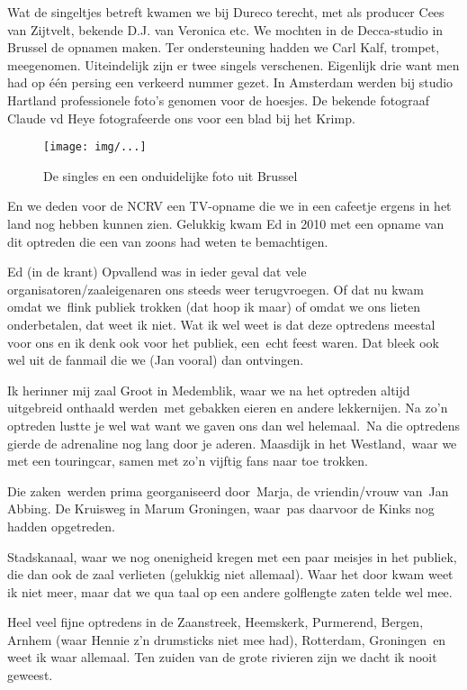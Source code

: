 \documentclass[10pt,twoside,openright]{memoir}
\begin{document}
Wat de singeltjes betreft kwamen we bij Dureco terecht, met als producer Cees van Zijtvelt, bekende D.J. van Veronica etc. We mochten in de Decca-studio in Brussel de opnamen maken. Ter ondersteuning hadden we Carl Kalf, trompet, meegenomen. Uiteindelijk zijn er twee singels verschenen. Eigenlijk drie want men had op één persing een verkeerd nummer gezet. In Amsterdam werden bij studio Hartland professionele foto’s genomen voor de hoesjes. De bekende fotograaf Claude vd Heye fotografeerde ons voor een blad bij het Krimp.

\begin{figure}[t]
\texttt{[image: img/...]}
\caption{De singles en een onduidelijke foto uit Brussel}
\end{figure}

En we deden voor de NCRV een TV-opname die we in een cafeetje ergens in het land nog hebben kunnen zien. Gelukkig kwam Ed in 2010 met een opname van dit optreden die een van zoons had weten te bemachtigen.

Ed (in de krant) Opvallend was in ieder geval dat vele organisatoren/zaaleigenaren ons steeds weer terugvroegen. Of dat nu kwam omdat we flink publiek trokken (dat hoop ik maar) of omdat we ons lieten onderbetalen, dat weet ik niet. Wat ik wel weet is dat deze optredens meestal voor ons en ik denk ook voor het publiek, een echt feest waren. Dat bleek ook wel uit de fanmail die we (Jan vooral) dan ontvingen. 

Ik herinner mij zaal Groot in Medemblik, waar we na het optreden altijd uitgebreid onthaald werden met gebakken eieren en andere lekkernijen. Na zo'n optreden lustte je wel wat want we gaven ons dan wel helemaal. Na die optredens gierde de adrenaline nog lang door je aderen. Maasdijk in het Westland, waar we met een touringcar, samen met zo'n vijftig fans naar toe trokken. 

Die zaken werden prima georganiseerd door Marja, de vriendin/vrouw van Jan Abbing. De Kruisweg in Marum Groningen, waar pas daarvoor de Kinks nog hadden opgetreden.

Stadskanaal, waar we nog onenigheid kregen met een paar meisjes in het publiek, die dan ook de zaal verlieten (gelukkig niet allemaal). Waar het door kwam weet ik niet meer, maar dat we qua taal op een andere golflengte zaten telde wel mee. 

Heel veel fijne optredens in de Zaanstreek, Heemskerk, Purmerend, Bergen, Arnhem (waar Hennie z'n drumsticks niet mee had), Rotterdam, Groningen en weet ik waar allemaal. Ten zuiden van de grote rivieren zijn we dacht ik nooit geweest. 
\end{document}
